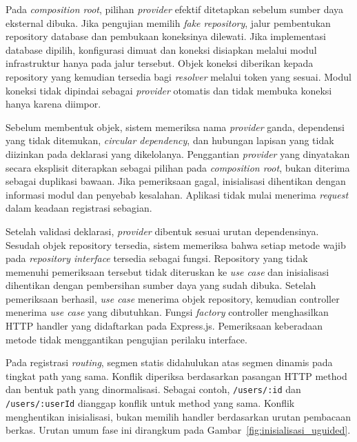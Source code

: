 \documentclass[12pt,a4paper,oneside]{report}
\begin{document}
Pada \textit{composition root}, pilihan \textit{provider} efektif ditetapkan sebelum sumber daya eksternal dibuka. Jika pengujian memilih \textit{fake repository}, jalur pembentukan repository database dan pembukaan koneksinya dilewati. Jika implementasi database dipilih, konfigurasi dimuat dan koneksi disiapkan melalui modul infrastruktur hanya pada jalur tersebut. Objek koneksi diberikan kepada repository yang kemudian tersedia bagi \textit{resolver} melalui token yang sesuai. Modul koneksi tidak dipindai sebagai \textit{provider} otomatis dan tidak membuka koneksi hanya karena diimpor.

Sebelum membentuk objek, sistem memeriksa nama \textit{provider} ganda, dependensi yang tidak ditemukan, \textit{circular dependency}, dan hubungan lapisan yang tidak diizinkan pada deklarasi yang dikelolanya. Penggantian \textit{provider} yang dinyatakan secara eksplisit diterapkan sebagai pilihan pada \textit{composition root}, bukan diterima sebagai duplikasi bawaan. Jika pemeriksaan gagal, inisialisasi dihentikan dengan informasi modul dan penyebab kesalahan. Aplikasi tidak mulai menerima \textit{request} dalam keadaan registrasi sebagian.

Setelah validasi deklarasi, \textit{provider} dibentuk sesuai urutan dependensinya. Sesudah objek repository tersedia, sistem memeriksa bahwa setiap metode wajib pada \textit{repository interface} tersedia sebagai fungsi. Repository yang tidak memenuhi pemeriksaan tersebut tidak diteruskan ke \textit{use case} dan inisialisasi dihentikan dengan pembersihan sumber daya yang sudah dibuka. Setelah pemeriksaan berhasil, \textit{use case} menerima objek repository, kemudian controller menerima \textit{use case} yang dibutuhkan. Fungsi \textit{factory} controller menghasilkan HTTP handler yang didaftarkan pada Express.js. Pemeriksaan keberadaan metode tidak menggantikan pengujian perilaku interface.

Pada registrasi \textit{routing}, segmen statis didahulukan atas segmen dinamis pada tingkat path yang sama. Konflik diperiksa berdasarkan pasangan HTTP method dan bentuk path yang dinormalisasi. Sebagai contoh, \texttt{/\allowbreak users/\allowbreak :id} dan \texttt{/\allowbreak users/\allowbreak :userId} dianggap konflik untuk method yang sama. Konflik menghentikan inisialisasi, bukan memilih handler berdasarkan urutan pembacaan berkas. Urutan umum fase ini dirangkum pada Gambar~\ref{fig:inisialisasi_uguided}.
\end{document}
